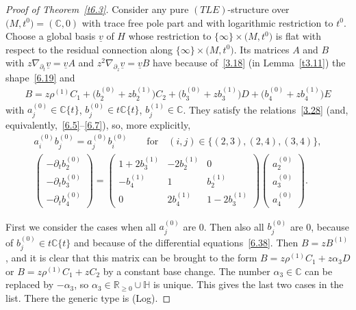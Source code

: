 \documentclass[pdftex]{sigma}%
\numberwithin{equation}{section}
\numberwithin{figure}{section}
\newcommand{\C}{{\mathbb C}}
\newcommand{\R}{{\mathbb R}}
\renewcommand{\H}{{\mathbb H}}
\newcommand{\uuuu}{\underline}
\newcommand{\paa}{\partial}
\newcommand{\nnn}{\nabla}
\begin{document}
\begin{proof}[Proof of Theorem~\ref{t6.3}]
Consider any pure $(TLE)$-structure over $\big(M,t^0\big)=(\C,0)$
with trace free pole part and with logarithmic restriction
to $t^0$. Choose a global basis $\uuuu{v}$ of $H$
whose restriction to
$\{\infty\}\times \big(M,t^0\big)$ is flat with
respect to the residual connection along
$\{\infty\}\times \big(M,t^0\big)$.
Its matrices $A$ and $B$ with
$z\nnn_{\paa_t}\uuuu{v}=\uuuu{v}A$ and
$z^2\nnn_{\paa_z}\uuuu{v}=\uuuu{v}B$
have because of~\eqref{3.18} (in Lemma~\ref{t3.11})
the shape~\eqref{6.19} and
\begin{gather*}%
B=z\rho^{(1)}C_1+\big(b_2^{(0)}+zb_2^{(1)}\big)C_2 +
\big(b_3^{(0)}+zb_3^{(1)}\big)D+\big(b_4^{(0)}+zb_4^{(1)}\big)E
\end{gather*}
with $a_j^{(0)}\in\C\{t\}$, $b_j^{(0)}\in t\C\{t\}$,
$b_j^{(1)}\in\C$. They satisfy the relations~\eqref{3.28}
(and, equivalently,~\eqref{6.5}--\eqref{6.7}),
so, more explicitly,
\begin{gather}\label{6.37}
a_i^{(0)}b_j^{(0)}=a_j^{(0)}b_i^{(0)}\qquad\text{for}\quad
(i,j)\in\{(2,3),(2,4),(3,4)\},
\\[1ex]
\begin{pmatrix}-\paa_tb_2^{(0)} \\ -\paa_tb_3^{(0)} \\
-\paa_tb_4^{(0)} \end{pmatrix}
= \begin{pmatrix}1+2b_3^{(1)} & -2b_2^{(1)} & 0 \\
-b_4^{(1)} & 1 & b_2^{(1)} \\
0 & 2b_4^{(1)} & 1-2b_3^{(1)} \end{pmatrix}
\begin{pmatrix} a_2^{(0)} \\ a_3^{(0)} \\ a_4^{(0)}
\end{pmatrix}\!. \label{6.38}
\end{gather}

First we consider the cases when all $a_j^{(0)}$ are 0.
Then also all $b_j^{(0)}$ are 0, because of
$b_j^{(0)}\in t\C\{t\}$ and because of the differential
equations~\eqref{6.38}.
Then $B=zB^{(1)}$, and it is clear that this matrix
can be brought to the form $B=z\rho^{(1)}C_1+ z\alpha_3 D$
or $B=z\rho^{(1)}C_1+zC_2$
by a constant base change.
The number $\alpha_3\in\C$ can be replaced by $-\alpha_3$, so
$\alpha_3\in\R_{\geq 0}\cup\H$ is unique.
This gives the last two cases in the list.
There the generic type is (Log).


\end{proof}
\end{document}
